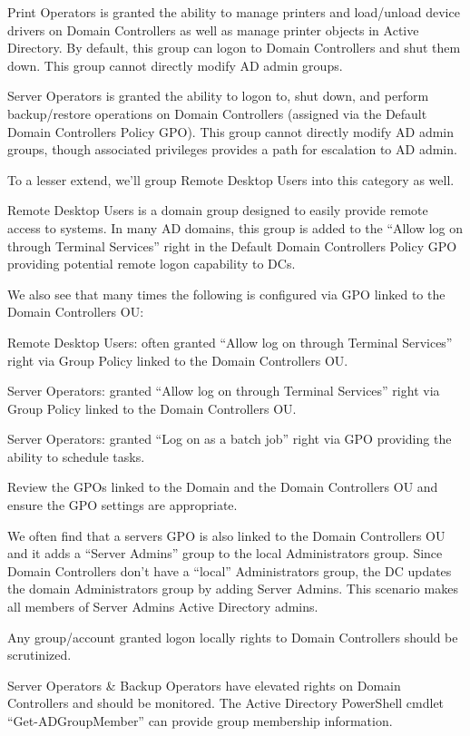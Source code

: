 Print Operators is granted the ability to manage printers and load/unload device drivers on Domain Controllers as well as manage printer objects in Active Directory. By default, this group can logon to Domain Controllers and shut them down. This group cannot directly modify AD admin groups.

Server Operators is granted the ability to logon to, shut down, and perform backup/restore operations on Domain Controllers (assigned via the Default Domain Controllers Policy GPO). This group cannot directly modify AD admin groups, though associated privileges provides a path for escalation to AD admin.

To a lesser extend, we’ll group Remote Desktop Users into this category as well.

Remote Desktop Users is a domain group designed to easily provide remote access to systems. In many AD domains, this group is added to the “Allow log on through Terminal Services” right in the Default Domain Controllers Policy GPO providing potential remote logon capability to DCs.

We also see that many times the following is configured via GPO linked to the Domain Controllers OU:

Remote Desktop Users: often granted “Allow log on through Terminal Services” right via Group Policy linked to the Domain Controllers OU.

Server Operators: granted “Allow log on through Terminal Services” right via Group Policy linked to the Domain Controllers OU.

Server Operators: granted “Log on as a batch job” right via GPO providing the ability to schedule tasks.

Review the GPOs linked to the Domain and the Domain Controllers OU and ensure the GPO settings are appropriate.

We often find that a servers GPO is also linked to the Domain Controllers OU and it adds a “Server Admins” group to the local Administrators group. Since Domain Controllers don’t have a “local” Administrators group, the DC updates the domain Administrators group by adding Server Admins. This scenario makes all members of Server Admins Active Directory admins.

Any group/account granted logon locally rights to Domain Controllers should be scrutinized.

Server Operators \& Backup Operators have elevated rights on Domain Controllers and should be monitored. The Active Directory PowerShell cmdlet “Get-ADGroupMember” can provide group membership information.

